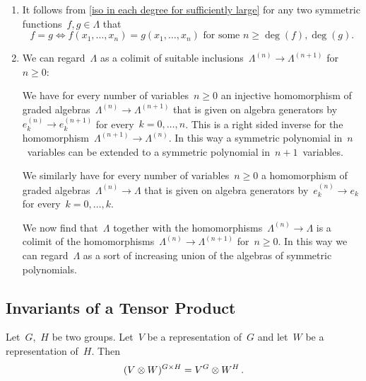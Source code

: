\documentclass[a4paper,11pt]{scrartcl}
\begin{document}
\begin{remark}
  \leavevmode
  \begin{enumerate}
    \item
      It follows from \cref{iso in each degree for sufficiently large} for any two symmetric functions~$f, g \in \Lambda$ that
      \[
        f = g
        \iff
        \text{$f(x_1, \dotsc, x_n) = g(x_1, \dotsc, x_n)$ for some~$n \geq \deg(f), \deg(g)$.}
      \]
    \item
      We can regard~$\Lambda$ as a colimit of suitable inclusions~$\Lambda^{(n)} \to \Lambda^{(n+1)}$ for~$n \geq 0$:

      We have for every number of variables~$n \geq 0$ an injective homomorphism of graded algebras~$\Lambda^{(n)} \to \Lambda^{(n+1)}$ that is given on algebra generators by~$e^{(n)}_k \to e^{(n+1)}_k$ for every~$k = 0, \dotsc, n$.
      This is a right sided inverse for the homomorphism~$\Lambda^{(n+1)} \to \Lambda^{(n)}$.
      In this way a symmetric polynomial in~$n$~variables can be extended to a symmetric polynomial in~$n+1$~variables.

      We similarly have for every number of variables~$n \geq 0$ a homomorphism of graded algebras~$\Lambda^{(n)} \to \Lambda$ that is given on algebra generators by~$e^{(n)}_k \to e_k$ for every~$k = 0, \dotsc, k$.

      We now find that~$\Lambda$ together with the homomorphisms~$\Lambda^{(n)} \to \Lambda$ is a colimit of the homomorphisms~$\Lambda^{(n)} \to \Lambda^{(n+1)}$ for~$n \geq 0$.
      In this way we can regard~$\Lambda$ as a sort of increasing union of the algebras of symmetric polynomials.
  \end{enumerate}
\end{remark}



\subsection{Invariants of a Tensor Product}

\begin{lemma}
  \label{invariants of tensor product}
  Let~$G$,~$H$ be two groups.
  Let~$V$ be a representation of~$G$ and let~$W$ be a representation of~$H$.
  Then
  \[
    (V \otimes W)^{G \times H}
    =
    V^G \otimes W^H \,.
  \]
\end{lemma}
\end{document}
